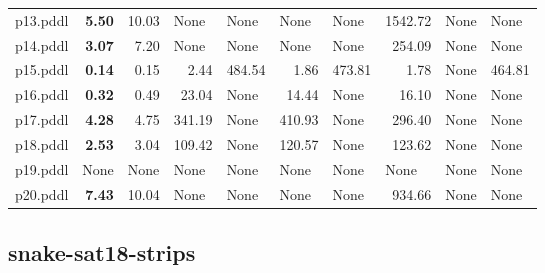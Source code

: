 \documentclass{article}
\begin{document}
\begin{tabular}{@{}lrrrrrrrrr@{}}
p13.pddl & \textbf{5.50} & 10.03 & \multicolumn{1}{|l|}{None} & \multicolumn{1}{|l|}{None} & \multicolumn{1}{|l|}{None} & \multicolumn{1}{|l|}{None} & 1542.72 & \multicolumn{1}{|l|}{None} & \multicolumn{1}{|l|}{None} \\
p14.pddl & \textbf{3.07} & 7.20 & \multicolumn{1}{|l|}{None} & \multicolumn{1}{|l|}{None} & \multicolumn{1}{|l|}{None} & \multicolumn{1}{|l|}{None} & 254.09 & \multicolumn{1}{|l|}{None} & \multicolumn{1}{|l|}{None} \\
p15.pddl & \textbf{0.14} & 0.15 & 2.44 & 484.54 & 1.86 & 473.81 & 1.78 & \multicolumn{1}{|l|}{None} & 464.81 \\
p16.pddl & \textbf{0.32} & 0.49 & 23.04 & \multicolumn{1}{|l|}{None} & 14.44 & \multicolumn{1}{|l|}{None} & 16.10 & \multicolumn{1}{|l|}{None} & \multicolumn{1}{|l|}{None} \\
p17.pddl & \textbf{4.28} & 4.75 & 341.19 & \multicolumn{1}{|l|}{None} & 410.93 & \multicolumn{1}{|l|}{None} & 296.40 & \multicolumn{1}{|l|}{None} & \multicolumn{1}{|l|}{None} \\
p18.pddl & \textbf{2.53} & 3.04 & 109.42 & \multicolumn{1}{|l|}{None} & 120.57 & \multicolumn{1}{|l|}{None} & 123.62 & \multicolumn{1}{|l|}{None} & \multicolumn{1}{|l|}{None} \\
p19.pddl & \multicolumn{1}{|l|}{None} & \multicolumn{1}{|l|}{None} & \multicolumn{1}{|l|}{None} & \multicolumn{1}{|l|}{None} & \multicolumn{1}{|l|}{None} & \multicolumn{1}{|l|}{None} & \multicolumn{1}{|l|}{None} & \multicolumn{1}{|l|}{None} & \multicolumn{1}{|l|}{None} \\
p20.pddl & \textbf{7.43} & 10.04 & \multicolumn{1}{|l|}{None} & \multicolumn{1}{|l|}{None} & \multicolumn{1}{|l|}{None} & \multicolumn{1}{|l|}{None} & 934.66 & \multicolumn{1}{|l|}{None} & \multicolumn{1}{|l|}{None} \\
\end{tabular}

\hypertarget{search_start_time-snake-sat18-strips}{}
\subsection*{snake-sat18-strips}
\end{document}
